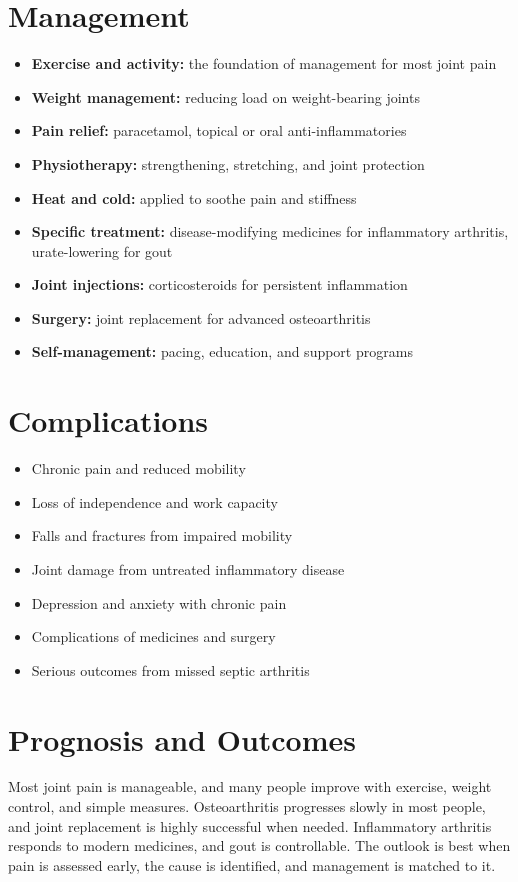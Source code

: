\section*{Management}
\begin{itemize}
    \item \textbf{Exercise and activity:} the foundation of management for most joint pain
    \item \textbf{Weight management:} reducing load on weight-bearing joints
    \item \textbf{Pain relief:} paracetamol, topical or oral anti-inflammatories
    \item \textbf{Physiotherapy:} strengthening, stretching, and joint protection
    \item \textbf{Heat and cold:} applied to soothe pain and stiffness
    \item \textbf{Specific treatment:} disease-modifying medicines for inflammatory arthritis, urate-lowering for gout
    \item \textbf{Joint injections:} corticosteroids for persistent inflammation
    \item \textbf{Surgery:} joint replacement for advanced osteoarthritis
    \item \textbf{Self-management:} pacing, education, and support programs
\end{itemize}

\section*{Complications}
\begin{itemize}
    \item Chronic pain and reduced mobility
    \item Loss of independence and work capacity
    \item Falls and fractures from impaired mobility
    \item Joint damage from untreated inflammatory disease
    \item Depression and anxiety with chronic pain
    \item Complications of medicines and surgery
    \item Serious outcomes from missed septic arthritis
\end{itemize}

\section*{Prognosis and Outcomes}
Most joint pain is manageable, and many people improve with exercise, weight control, and simple measures. Osteoarthritis progresses slowly in most people, and joint replacement is highly successful when needed. Inflammatory arthritis responds to modern medicines, and gout is controllable. The outlook is best when pain is assessed early, the cause is identified, and management is matched to it.

